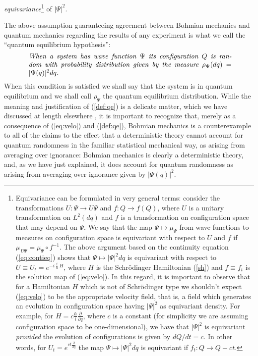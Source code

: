 \documentclass[12pt]{article}
\newcommand{\eq}[1]{(\ref{#1})}
\newcommand{\Sc}{Schr\"{o}dinger}
\newcommand{\BM}{Bohmian mechanics}
\newcommand{\wf}{wave function}
\begin{document}
\emph{equivariance}\footnote{\label{fn:equivariance} Equivariance can
   be formulated in very general terms: consider the transformations $
   U: \Psi \to U \Psi$ and $f: Q \to f(Q) $, where $U$ is a unitary
   transformation on $L^{2}(dq)$ and $f$ is a transformation on
   configuration space that may depend on $\Psi$.  We say that the map
   $\Psi\mapsto\mu_{\Psi}$ from \wf s to measures on configuration
   space is equivariant with respect to $U$ and $f$ if $ \mu_{\,U\Psi}
   = \mu_{\Psi}\circ f^{-1} $.  The above argument based on the
   continuity equation (\ref{eq:contieq}) shows that $ \Psi\mapsto
   |\Psi|^{2} dq$ is equivariant with respect to $U\equiv U_{t} =
   e^{-i\,\frac{t}{\hbar}\,H}$, where $H$ is the \Sc{} Hamiltonian
   (\ref{sh}) and $f\equiv f_{t}$ is the solution map of
   (\ref{eq:velo}).  In this regard, it is important to observe that
   for a Hamiltonian $H$ which is not of \Sc{} type we shouldn't expect
   \eq{eq:velo} to be the appropriate velocity field, that is, a field
   which generates an evolution in configuration space having $
   |\Psi|^{2} $ as equivariant density.  For example, for $H=
   c\frac{\hbar}{i}\frac{\partial}{\partial q}$, where $c$ is a
   constant (for simplicity we are assuming configuration space to be
   one-dimensional), we have that $ |\Psi|^{2} $ is equivariant
   \emph{provided} the evolution of configurations is given by
   ${dQ}/{dt} = c$.  In other words, for $U_{t}= e^{ct
     \frac{\partial}{\partial q}}$ the map $ \Psi\mapsto |\Psi|^{2} dq$
   is equivariant if $f_{t}: Q\to Q +ct$.}  of $|\Psi|^2$.

The above assumption guaranteeing agreement between \BM{} and quantum
mechanics regarding the results of any experiment is what we call the
``quantum equilibrium hypothesis'':
\begin{equation}
\mbox{
\begin{minipage}{0.85\textwidth}
   \emph{When a system has \wf\ $\Psi$ its configuration $Q$ is random
     with probability distribution given by the measure
     $\rho_{\Psi}(dq)=|\Psi(q)|^2dq$.}
\end{minipage}}
\label{def:qe}
\end{equation}
When this condition is satisfied we shall say that the system is in
quantum equilibrium and we shall call $\rho_{\Psi}$ the quantum
equilibrium distribution.  While the meaning and justification of
(\ref{def:qe}) is a delicate matter, which we have discussed at length
elsewhere \cite{DGZ92a}, it is important to recognize that, merely as
a consequence of (\ref{eq:velo}) and (\ref{def:qe}), \BM{} is a
counterexample to all of the claims to the effect that a deterministic
theory cannot account for quantum randomness in the familiar
statistical mechanical way, as arising {}from averaging over
ignorance: \BM{} is clearly a deterministic theory, and, as we have
just explained, it does account for quantum randomness as arising
{}from averaging over ignorance given by $|\Psi(q)|^2$.
\end{document}
